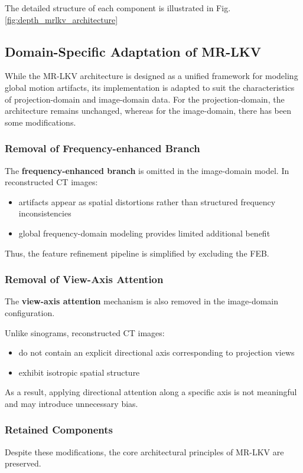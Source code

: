 The detailed structure of each component is illustrated in Fig. \ref{fig:depth_mrlkv_architecture} 

\subsection{Domain-Specific Adaptation of MR-LKV }

While the MR-LKV architecture is designed as a unified framework for modeling global motion artifacts, its implementation is adapted to suit the characteristics of projection-domain and image-domain data. For the projection-domain, the architecture remains unchanged, whereas for the image-domain, there has been some modifications.

\subsubsection{Removal of Frequency-enhanced Branch}
    The \textbf{frequency-enhanced branch} is omitted in the image-domain model.
In reconstructed CT images:

\begin{itemize}
    \item artifacts appear as spatial distortions rather than structured frequency inconsistencies 
    \item global frequency-domain modeling provides limited additional benefit 
\end{itemize}
Thus, the feature refinement pipeline is simplified by excluding the FEB.
\subsubsection{Removal of View-Axis Attention}
The \textbf{view-axis attention} mechanism is also removed in the image-domain configuration.

Unlike sinograms, reconstructed CT images:

\begin{itemize}
    \item do not contain an explicit directional axis corresponding to projection views 
    \item exhibit isotropic spatial structure 
\end{itemize}
As a result, applying directional attention along a specific axis is not meaningful and may introduce unnecessary bias.

\subsubsection{Retained Components}
Despite these modifications, the core architectural principles of MR-LKV are preserved.

